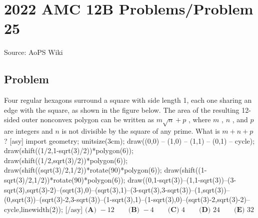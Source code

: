 \documentclass[12pt]{article}
\begin{document}
\section*{{2022 AMC 12B Problems/Problem 25}}
Source: AoPS Wiki

\subsection*{Problem}
Four regular hexagons surround a square with side length 1, each one sharing an edge with the square,
as shown in the figure below. The area of the resulting 12-sided outer nonconvex polygon can be
written as $m \sqrt{n} + p$ , where $m$ , $n$ , and $p$ are integers and $n$ is not divisible by the square of any prime.
What is $m+n+p$ ? [asy] import geometry; unitsize(3cm); draw((0,0) -- (1,0) -- (1,1) -- (0,1) -- cycle); draw(shift((1/2,1-sqrt(3)/2))*polygon(6)); draw(shift((1/2,sqrt(3)/2))*polygon(6)); draw(shift((sqrt(3)/2,1/2))*rotate(90)*polygon(6)); draw(shift((1-sqrt(3)/2,1/2))*rotate(90)*polygon(6)); draw((0,1-sqrt(3))--(1,1-sqrt(3))--(3-sqrt(3),sqrt(3)-2)--(sqrt(3),0)--(sqrt(3),1)--(3-sqrt(3),3-sqrt(3))--(1,sqrt(3))--(0,sqrt(3))--(sqrt(3)-2,3-sqrt(3))--(1-sqrt(3),1)--(1-sqrt(3),0)--(sqrt(3)-2,sqrt(3)-2)--cycle,linewidth(2)); [/asy] $\textbf{(A) } -12 \qquad \textbf{(B) }-4 \qquad \textbf{(C) } 4 \qquad \textbf{(D) }24 \qquad \textbf{(E) }32$
\end{document}
